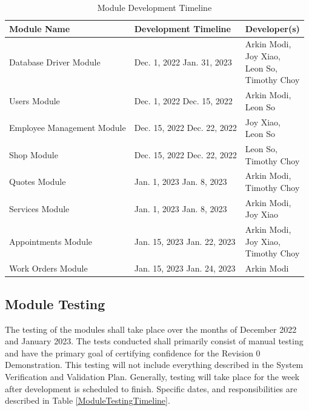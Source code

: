 \documentclass[12pt, titlepage]{article}
\begin{document}
\begin{table}[H]
	\caption{Module Development Timeline} \label{ModuleDevelopmentTimeline}
	\begin{tabular}{|p{}|p{}|p{}|}
		\hline
		\textbf{Module Name}       & \textbf{Development Timeline}             & \textbf{Developer(s)}    \\
		\hline
		Database Driver Module     & Dec. 1, 2022 \textemdash{} Jan. 31, 2023  & \makecell[l]{Arkin Modi, \\Joy Xiao,\\Leon So,\\Timothy Choy} \\
		\hline
		Users Module               & Dec. 1, 2022 \textemdash{} Dec. 15, 2022  & \makecell[l]{Arkin Modi, \\Leon So} \\
		\hline
		Employee Management Module & Dec. 15, 2022 \textemdash{} Dec. 22, 2022 & \makecell[l]{Joy Xiao,   \\Leon So} \\
		\hline
		Shop Module                & Dec. 15, 2022 \textemdash{} Dec. 22, 2022 & \makecell[l]{Leon So,    \\Timothy Choy} \\
		\hline
		Quotes Module              & Jan. 1, 2023 \textemdash{} Jan. 8, 2023   & \makecell[l]{Arkin Modi, \\Timothy Choy} \\
		\hline
		Services Module            & Jan. 1, 2023 \textemdash{} Jan. 8, 2023   & \makecell[l]{Arkin Modi, \\Joy Xiao} \\
		\hline
		Appointments Module        & Jan. 15, 2023 \textemdash{} Jan. 22, 2023 & \makecell[l]{Arkin Modi, \\Joy Xiao,\\Timothy Choy} \\
		\hline
		Work Orders Module         & Jan. 15, 2023 \textemdash{} Jan. 24, 2023 & Arkin Modi               \\
		\hline
	\end{tabular}
\end{table}

\subsection{Module Testing}

The testing of the modules shall take place over the months of December 2022 and January 2023. The
tests conducted shall primarily consist of manual testing and have the primary goal of certifying
confidence for the Revision 0 Demonstration. This testing will not include everything described in
the System Verification and Validation Plan. Generally, testing will take place for the week after
development is scheduled to finish. Specific dates, and responsibilities are described in Table
\ref{ModuleTestingTimeline}.
\end{document}
